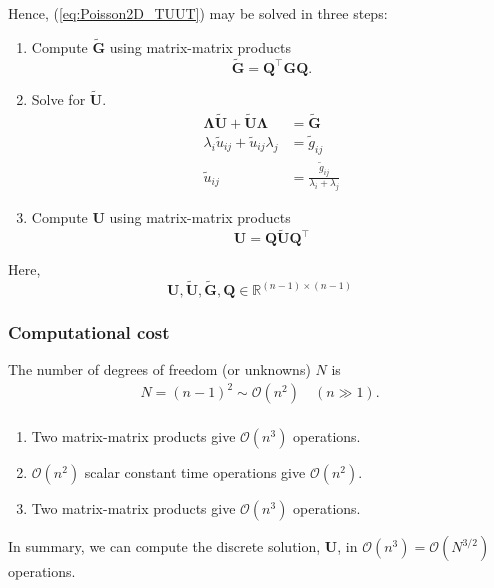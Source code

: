 Hence, (\ref{eq:Poisson2D_TUUT}) may be solved in three steps:

\begin{enumerate}
\item Compute $\tilde{\bm G}$ using matrix-matrix products
  \begin{equation*}
    \tilde{\bm G} = \bm Q^\intercal \bm G \bm Q.
  \end{equation*}
\item Solve for $\tilde{\bm U}$.
  \begin{align*}
    \bm \Lambda \tilde{\bm U} + \tilde{\bm U} \bm \Lambda &= \tilde{\bm G} \\
    \lambda_i \tilde{u}_{ij} + \tilde{u}_{ij} \lambda_j &= \tilde{g}_{ij} \\
    \tilde{u}_{ij} &= \frac{\tilde{g}_{ij}}{\lambda_i + \lambda_j}
  \end{align*}
\item Compute $\bm U$ using matrix-matrix products
  \begin{equation*}
    \bm U = \bm Q \tilde{\bm U} \bm Q^\intercal
  \end{equation*}
\end{enumerate}

Here,
\begin{equation*}
  \bm U, \tilde{\bm U}, \tilde{\bm G}, \bm Q \in \mathbb{R}^{(n-1) \times (n-1)}
\end{equation*}

\subsubsection{Computational cost}

The number of degrees of freedom (or unknowns) $N$ is
\begin{align*}
N = (n-1)^2 \sim \mathcal{O}(n^2) \quad (n \gg 1).\\
\end{align*}

\begin{enumerate}
\item Two matrix-matrix products give $\mathcal{O}(n^3)$ operations.
\item $\mathcal{O}(n^2)$ scalar constant time operations give $\mathcal{O}(n^2)$.
\item Two matrix-matrix products give $\mathcal{O}(n^3)$ operations.
\end{enumerate}
In summary, we can compute the discrete solution, $\bm U$, in
$\mathcal{O}(n^3)=\mathcal{O}(N^{3/2})$ operations.

